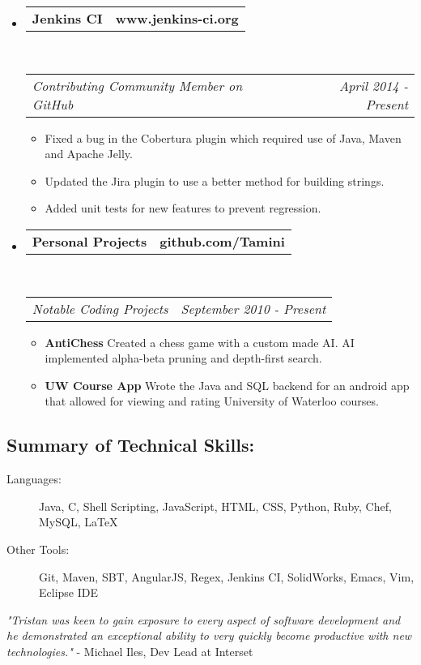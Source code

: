 \documentclass[11pt]{article} %
\makeatletter
\newcommand{\CPP}
{C\nolinebreak[4]\hspace{-.05em}\raisebox{.22ex}{\footnotesize\bf ++}}
\newcommand{\headerrow}[2]
{\begin{tabular*}{\linewidth}{l@{\extracolsep{\fill}}r}
	#1 &
	#2 \\
\end{tabular*}}
\makeatother
\begin{document}
\begin{itemize}[leftmargin=-0.5em, label={}]
	\item
	\headerrow
		{\textbf{Jenkins CI}}
		{\textbf{www.jenkins-ci.org}}
	\\
	\headerrow
		{\emph{Contributing Community Member on GitHub}}
		{\emph{April 2014 - Present}}
	\begin{itemize}
		\item Fixed a bug in the Cobertura plugin which required use of Java, Maven and Apache Jelly.
		\item Updated the Jira plugin to use a better method for building strings.
		\item Added unit tests for new features to prevent regression. 
	\end{itemize}

	\item
	\headerrow
		{\textbf{Personal Projects}}
		{\textbf{github.com/Tamini}}
	\\
	\headerrow
		{\emph{Notable Coding Projects}}
		{\emph{September 2010 - Present}}
	\begin{itemize}
		\item {\bf AntiChess} Created a chess game with a custom made AI. AI implemented alpha-beta pruning and depth-first search.
		\item {\bf UW Course App} Wrote the Java and SQL backend for an android app that allowed for viewing and rating University of Waterloo courses.
	\end{itemize}

\end{itemize}
\subsection*{Summary of Technical Skills:}
\begin{description}
	\item[Languages:] Java, \CPP, Shell Scripting, JavaScript, HTML, CSS, Python, Ruby, Chef, MySQL, \LaTeX\
	\item[Other Tools:] Git, Maven, SBT, AngularJS, Regex, Jenkins CI, SolidWorks, Emacs, Vim, Eclipse IDE
\end{description}
\begin{center}
\textit{\newline "Tristan was keen to gain exposure to every aspect of software development and he demonstrated an exceptional ability to very quickly become productive with new technologies." \newline
}
- Michael Iles, Dev Lead at Interset
\end{center}
\end{document}
